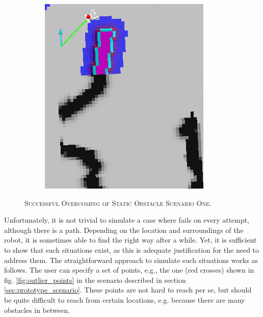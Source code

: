 \documentclass[english, master, utf8]{base/thesis_KBS}
\newcommand{\code}{\collectverb{\codebox}}
\begin{document}
\begin{figure}[H]
\begin{subfigure}[b]{0.24\textwidth}
        \caption{\textsc{}}
        \label{fig:succ_3}
    \end{subfigure}
    \hfill
    \begin{subfigure}[b]{0.24\textwidth}
        \centering
        \includegraphics[width=\textwidth]{pics/succ_4.png}
        \caption{\textsc{}}
        \label{fig:succ_4}
    \end{subfigure}
\caption{\textsc{Successful Overcoming of Static Obstacle Scenario One.}}
\label{fig:obstacle_success}
\end{figure}
Unfortunately, it is not trivial to
simulate a case where \code{move_base_flex} fails on every attempt, although there is a path. Depending on the location and surroundings of the robot, it is sometimes able to find
the right way after a while. Yet, it is sufficient to show that such situations exist, as this is adequate justification for the need to address them. The straightforward approach to
simulate such situations works as follows. The user can specify a set of points, e.g., the one (red crosses) shown in fig. \ref{fig:outlier_points} in the scenario described in section \ref{sec:prototype_scenario}.
These points are not hard to reach per se, but should be quite difficult to reach from certain locations, e.g. because there are many obstacles in between.
\end{document}
